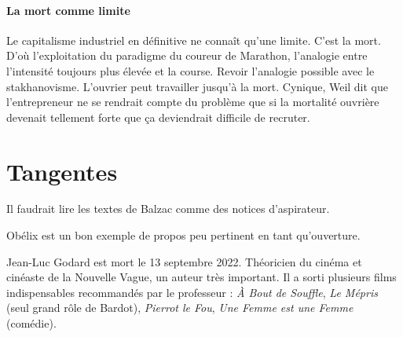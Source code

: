 \documentclass[a4paper,12pt]{book}
\begin{document}
\subsubsection{La mort comme limite}
Le capitalisme industriel en définitive ne connaît qu'une limite. C'est la mort. D'où l'exploitation du paradigme du coureur de Marathon, l'analogie entre l'intensité toujours plus élevée et la course. Revoir l'analogie possible avec le stakhanovisme. L'ouvrier peut travailler jusqu'à la mort. Cynique, Weil dit que l'entrepreneur ne se rendrait compte du problème que si la mortalité ouvrière devenait tellement forte que ça deviendrait difficile de recruter.





\chapter{Tangentes}
Il faudrait lire les textes de Balzac comme des notices d'aspirateur.
\par Obélix est un bon exemple de propos peu pertinent en tant qu'ouverture.
\par Jean-Luc Godard est mort le 13 septembre 2022. Théoricien du cinéma et cinéaste de la Nouvelle Vague, un auteur très important. Il a sorti plusieurs films indispensables recommandés par le professeur : \textit{À Bout de Souffle}, \textit{Le Mépris} (seul grand rôle de Bardot), \textit{Pierrot le Fou}, \textit{Une Femme est une Femme} (comédie).
\end{document}

